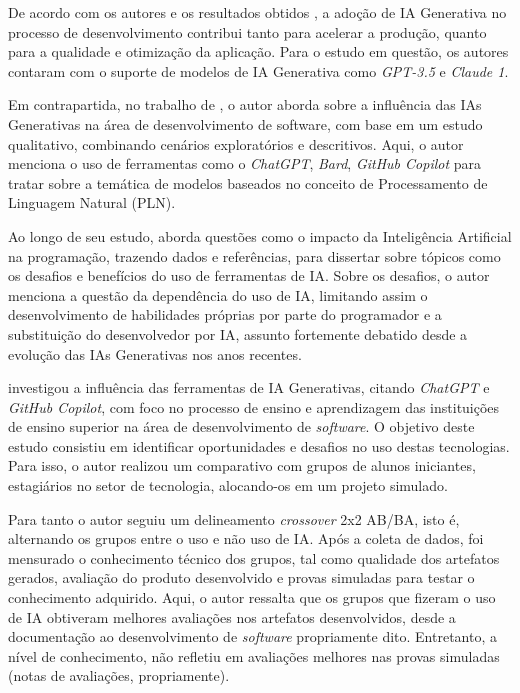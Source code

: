 \documentclass[english,brazilian]{UNISINOSartigo} %
\begin{document}
De acordo com os autores e os resultados obtidos \cite{daSilva2025}, a adoção de IA Generativa no processo de desenvolvimento contribui tanto para acelerar a produção, quanto para a qualidade e otimização da aplicação. Para o estudo em questão, os autores contaram com o suporte de modelos de IA Generativa como \textit{GPT-3.5} e \textit{Claude 1}.

Em contrapartida, no trabalho de , o autor aborda sobre a influência das IAs Generativas na área de desenvolvimento de software, com base em um estudo qualitativo, combinando cenários exploratórios e descritivos. Aqui, o autor menciona o uso de ferramentas como o \textit{ChatGPT}, \textit{Bard}, \textit{GitHub Copilot} para tratar sobre a temática de modelos baseados no conceito de Processamento de Linguagem Natural (PLN).

Ao longo de seu estudo,  aborda questões como o impacto da Inteligência Artificial na programação, trazendo dados e referências, para dissertar sobre tópicos como os desafios e benefícios do uso de ferramentas de IA. Sobre os desafios, o autor menciona a questão da dependência do uso de IA, limitando assim o desenvolvimento de habilidades próprias por parte do programador e a substituição do desenvolvedor por IA, assunto fortemente debatido desde a evolução das IAs Generativas nos anos recentes. 

 investigou a influência das ferramentas de IA Generativas, citando \textit{ChatGPT} e \textit{GitHub Copilot}, com foco no processo de ensino e aprendizagem das instituições de ensino superior na área de desenvolvimento de \textit{software}. O objetivo deste estudo consistiu em identificar oportunidades e desafios no uso destas tecnologias. Para isso, o autor realizou um comparativo com grupos de alunos iniciantes, estagiários no setor de tecnologia, alocando-os em um projeto simulado.

Para tanto o autor \cite{santos2024} seguiu um delineamento \textit{crossover} 2x2 AB/BA, isto é, alternando os grupos entre o uso e não uso de IA. Após a coleta de dados, foi mensurado o conhecimento técnico dos grupos, tal como qualidade dos artefatos gerados, avaliação do produto desenvolvido e provas simuladas para testar o conhecimento adquirido. Aqui, o autor ressalta que os grupos que fizeram o uso de IA obtiveram melhores avaliações nos artefatos desenvolvidos, desde a documentação ao desenvolvimento de \textit{software} propriamente dito. Entretanto, a nível de conhecimento, não refletiu em avaliações melhores nas provas simuladas (notas de avaliações, propriamente).
\end{document}
